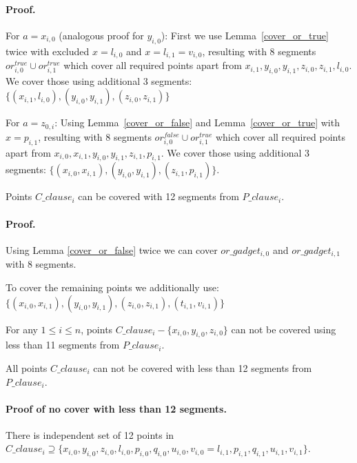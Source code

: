 \paragraph{Proof.}
For $a = x_{i, 0}$ (analogous proof for $y_{i, 0}$):
First we use Lemma~\ref{cover_or_true} twice with excluded $x = l_{i, 0}$ and
$x = l_{i, 1} = v_{i, 0}$,
resulting with 8 segments $or^{true}_{i, 0} \cup or^{true}_{i, 1}$
which cover all required points apart from
$x_{i, 1}, y_{i, 0}, y_{i, 1}, z_{i, 0}, z_{i, 1}, l_{i, 0}$.
We cover those using additional 3 segments:
$\{ (x_{i, 1}, l_{i, 0}), (y_{i, 0}, y_{i, 1}),
(z_{i, 0}, z_{i, 1}) \}$

For $a = z_{0, i}$:
Using Lemma~\ref{cover_or_false} and Lemma~\ref{cover_or_true} with
$x = p_{i, 1}$,
resulting with 8 segments $or^{false}_{i, 0} \cup or^{true}_{i, 1}$
which cover all required points apart from
$x_{i, 0}, x_{i, 1}, y_{i, 0}, y_{i, 1}, z_{i, 1}, p_{i, 1}$.
We cover those using additional 3 segments:
$\{ (x_{i, 0}, x_{i, 1}), (y_{i, 0}, y_{i, 1}),
(z_{i, 1}, p_{i, 1}) \}$.

\begin{lemma}
\label{cover_clauses_solution_false}
 Points $C\_clause_i$ can be covered with 12 segments from $P\_clause_i$.
\end{lemma}

\paragraph{Proof.}
Using Lemma \ref{cover_or_false} twice we can
cover $or\_gadget_{i,0}$ and  $or\_gadget_{i,1}$
with 8 segments.

To cover the remaining points we additionally use:
$\{ (x_{i, 0}, x_{i, 1}), (y_{i, 0}, y_{i, 1}),
(z_{i, 0}, z_{i, 1}), (t_{i, 1}, v_{i, 1}) \}$


\begin{lemma}
\label{cover_clauses_segments_no_less}
For any $1 \le i \le n$,
points $C\_clause_i - \{ x_{i, 0}, y_{i, 0}, z_{i, 0}\}$
can not be covered using less than 11 segments from $P\_clause_i$.

All points $C\_clause_i$ can not be covered with less than 12 segments
from $P\_clause_i$.
\end{lemma}


\paragraph{Proof of no cover with less than 12 segments.}
There is independent set of 12 points in $C\_clause_i \supseteq
\{ x_{i, 0}, y_{i, 0}, z_{i, 0}, l_{i, 0}, p_{i, 0}, q_{i, 0},
u_{i, 0}, v_{i, 0} = l_{i, 1}, p_{i, 1}, q_{i, 1}, u_{i, 1}, v_{i, 1} \}$.

